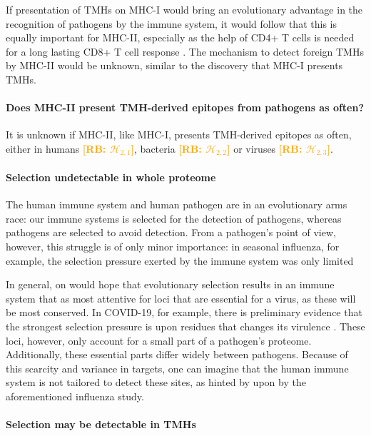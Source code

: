 \documentclass{article}
\newcommand{\richel}[1]{\textcolor{orange}{\textbf{[RB: #1]}}}
\begin{document}
If presentation of TMHs on MHC-I would bring an evolutionary advantage 
in the recognition of pathogens by the immune system, 
it would follow that this is equally important for MHC-II, 
especially as the help of CD4+ T cells is needed for a long lasting CD8+ T cell 
response \cite{novy2007cd4}. 
The mechanism to detect foreign TMHs by MHC-II would be unknown, 
similar to the discovery that MHC-I presents TMHs.

\paragraph{Does MHC-II present TMH-derived epitopes from pathogens as often?}

It is unknown if MHC-II, like MHC-I, 
presents TMH-derived epitopes as often, either 
in humans \richel{$\mathcal{H}_{2,1}$},
bacteria \richel{$\mathcal{H}_{2,2}$}
or viruses \richel{$\mathcal{H}_{2,3}$}.

\paragraph{Selection undetectable in whole proteome}

The human immune system and human pathogen are in an evolutionary
arms race: our immune systems is selected for the detection
of pathogens, whereas pathogens are selected to avoid detection.
From a pathogen's point of view, however, this struggle 
is of only minor importance:
in seasonal influenza, for example, the selection pressure
exerted by the immune system was only limited \cite{han2019individual}

In general, on would hope that evolutionary selection results in
an immune system that as most attentive for loci that are
essential for a virus, as these will be most conserved.
In COVID-19, for example, there is preliminary evidence that the strongest
selection pressure is upon residues that changes its 
virulence \cite{velazquez2020positive}.
These loci, however, only account for a small part of a pathogen's proteome.
Additionally, these essential parts differ widely between pathogens.
Because of this scarcity and variance in targets, 
one can imagine that the human immune system 
is not tailored to detect these sites, 
as hinted by upon by the aforementioned influenza study.

\paragraph{Selection may be detectable in TMHs}
\end{document}
